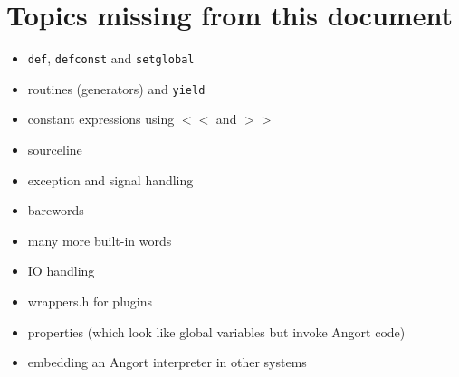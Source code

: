 
\section{Topics missing from this document}
\begin{itemize}
\item \texttt{def}, \texttt{defconst} and \texttt{setglobal} 
\item routines (generators) and \texttt{yield}
\item constant expressions using $<<$ and $>>$
\item sourceline
\item exception and signal handling
\item barewords
\item many more built-in words
\item IO handling
\item wrappers.h for plugins
\item properties (which look like global variables but invoke Angort code)
\item embedding an Angort interpreter in other systems
\end{itemize}




